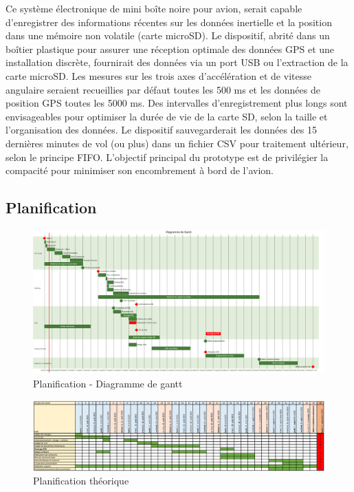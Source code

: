 Ce système électronique de mini boîte noire pour avion, serait capable d'enregistrer des informations récentes sur les données inertielle et la position dans une mémoire non volatile (carte microSD). Le dispositif, abrité dans un boîtier plastique pour assurer une réception optimale des données GPS et une installation discrète, fournirait des données via un port USB ou l'extraction de la carte microSD. Les mesures sur les trois axes d'accélération et de vitesse angulaire seraient recueillies par défaut toutes les 500 ms et les données de position GPS toutes les 5000 ms. Des intervalles d'enregistrement plus longs sont envisageables pour optimiser la durée de vie de la carte SD, selon la taille et l'organisation des données. Le dispositif sauvegarderait les données des 15 dernières minutes de vol (ou plus) dans un fichier CSV pour traitement ultérieur, selon le principe FIFO. L'objectif principal du prototype est de privilégier la compacité pour minimiser son encombrement à bord de l'avion.


\clearpage

\subsection{Planification}
\begin{figure}[h]
	\centering
	\includegraphics[width=1.1\linewidth]{../figures/cdc/planif}
	\caption{Planification - Diagramme de gantt}
	\label{fig:planification}
\end{figure}
\begin{figure}[h]
	\centering
	\includegraphics[width=1.1\linewidth]{../figures/cdc/planif_theorique}
	\caption{Planification théorique}
	\label{fig:planiftheorique}
\end{figure}


